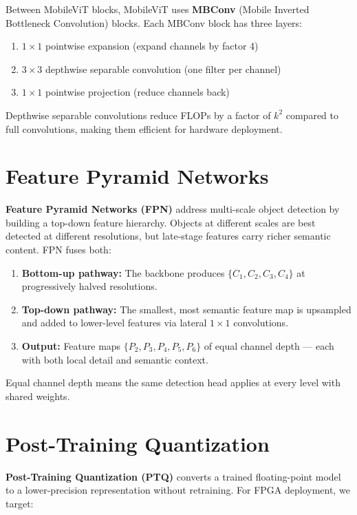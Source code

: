 Between MobileViT blocks, MobileViT uses \textbf{MBConv} (Mobile Inverted Bottleneck Convolution) blocks. Each MBConv block has three layers:
\begin{enumerate}
    \item $1\times1$ pointwise expansion (expand channels by factor 4)
    \item $3\times3$ depthwise separable convolution (one filter per channel)
    \item $1\times1$ pointwise projection (reduce channels back)
\end{enumerate}
Depthwise separable convolutions reduce FLOPs by a factor of $k^2$ compared to full convolutions, making them efficient for hardware deployment.

\section{Feature Pyramid Networks}

\textbf{Feature Pyramid Networks (FPN)} \cite{ref4} address multi-scale object detection by building a top-down feature hierarchy. Objects at different scales are best detected at different resolutions, but late-stage features carry richer semantic content. FPN fuses both:

\begin{enumerate}
    \item \textbf{Bottom-up pathway:} The backbone produces $\{C_1, C_2, C_3, C_4\}$ at progressively halved resolutions.
    \item \textbf{Top-down pathway:} The smallest, most semantic feature map is upsampled and added to lower-level features via lateral $1\times1$ convolutions.
    \item \textbf{Output:} Feature maps $\{P_2, P_3, P_4, P_5, P_6\}$ of equal channel depth — each with both local detail and semantic context.
\end{enumerate}

Equal channel depth means the same detection head applies at every level with shared weights.

\section{Post-Training Quantization}

\textbf{Post-Training Quantization (PTQ)} converts a trained floating-point model to a lower-precision representation without retraining. For FPGA deployment, we target:

